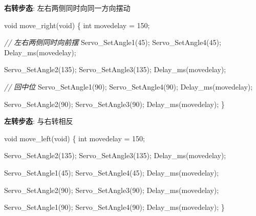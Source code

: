\documentclass[
]{article}
\newenvironment{Shaded}{}{}
\newcommand{\CommentTok}[1]{\textcolor[rgb]{0.38,0.63,0.69}{\textit{#1}}}
\newcommand{\DataTypeTok}[1]{\textcolor[rgb]{0.56,0.13,0.00}{#1}}
\newcommand{\DecValTok}[1]{\textcolor[rgb]{0.25,0.63,0.44}{#1}}
\newcommand{\NormalTok}[1]{#1}
\begin{document}
\textbf{右转步态}: 左右两侧同时向同一方向摆动

\begin{Shaded}
\begin{Highlighting}[]
\DataTypeTok{void}\NormalTok{ move\_right(}\DataTypeTok{void}\NormalTok{)}
\NormalTok{\{}
    \DataTypeTok{int}\NormalTok{ movedelay = }\DecValTok{150}\NormalTok{;}
    
    \CommentTok{// 左右两侧同时向前摆}
\NormalTok{    Servo\_SetAngle1(}\DecValTok{45}\NormalTok{);}
\NormalTok{    Servo\_SetAngle4(}\DecValTok{45}\NormalTok{);}
\NormalTok{    Delay\_ms(movedelay);}
    
\NormalTok{    Servo\_SetAngle2(}\DecValTok{135}\NormalTok{);}
\NormalTok{    Servo\_SetAngle3(}\DecValTok{135}\NormalTok{);}
\NormalTok{    Delay\_ms(movedelay);}
    
    \CommentTok{// 回中位}
\NormalTok{    Servo\_SetAngle1(}\DecValTok{90}\NormalTok{);}
\NormalTok{    Servo\_SetAngle4(}\DecValTok{90}\NormalTok{);}
\NormalTok{    Delay\_ms(movedelay);}
    
\NormalTok{    Servo\_SetAngle2(}\DecValTok{90}\NormalTok{);}
\NormalTok{    Servo\_SetAngle3(}\DecValTok{90}\NormalTok{);}
\NormalTok{    Delay\_ms(movedelay);}
\NormalTok{\}}
\end{Highlighting}
\end{Shaded}

\textbf{左转步态}: 与右转相反

\begin{Shaded}
\begin{Highlighting}[]
\DataTypeTok{void}\NormalTok{ move\_left(}\DataTypeTok{void}\NormalTok{)}
\NormalTok{\{}
    \DataTypeTok{int}\NormalTok{ movedelay = }\DecValTok{150}\NormalTok{;}
    
\NormalTok{    Servo\_SetAngle2(}\DecValTok{135}\NormalTok{);}
\NormalTok{    Servo\_SetAngle3(}\DecValTok{135}\NormalTok{);}
\NormalTok{    Delay\_ms(movedelay);}
    
\NormalTok{    Servo\_SetAngle1(}\DecValTok{45}\NormalTok{);}
\NormalTok{    Servo\_SetAngle4(}\DecValTok{45}\NormalTok{);}
\NormalTok{    Delay\_ms(movedelay);}
    
\NormalTok{    Servo\_SetAngle2(}\DecValTok{90}\NormalTok{);}
\NormalTok{    Servo\_SetAngle3(}\DecValTok{90}\NormalTok{);}
\NormalTok{    Delay\_ms(movedelay);}
    
\NormalTok{    Servo\_SetAngle1(}\DecValTok{90}\NormalTok{);}
\NormalTok{    Servo\_SetAngle4(}\DecValTok{90}\NormalTok{);}
\NormalTok{    Delay\_ms(movedelay);}
\NormalTok{\}}
\end{Highlighting}
\end{Shaded}
\end{document}
